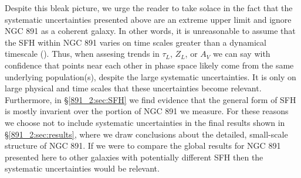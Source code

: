 Despite this bleak picture, we urge the reader to take solace in the
fact that the systematic uncertainties presented above are an extreme
upper limit and ignore NGC 891 as a coherent galaxy. In other words,
it is unreasonable to assume that the SFH within NGC 891 varies on
time scales greater than a dynamical timescale (). Thus, when assesing trends in $\tau_L$, $Z_L$, or $A_V$ we
can say with confidence that points near each other in phase space
likely come from the same underlying population(s), despite the large
systematic uncertainties. It is only on large physical and time scales
that these uncertainties become relevant. Furthermore, in
\S\ref{891_2:sec:SFH} we find evidence that the general form of SFH is
mostly invarient over the portion of NGC 891 we measure. For these
reasons we choose not to include systematic uncertainties in the final
results shown in \S\ref{891_2:sec:results}, where we draw conclusions about
the detailed, small-scale structure of NGC 891. If we were to compare
the global results for NGC 891 presented here to other galaxies with
potentially different SFH then the systematic uncertainties would be
relevant.


